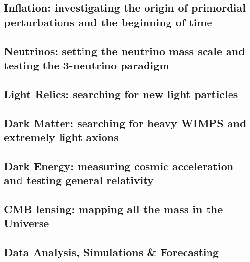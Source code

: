 \subsection*{Inflation: investigating the origin of primordial perturbations and the beginning of time}



\subsection*{Neutrinos: setting the neutrino mass scale and testing the 3-neutrino paradigm}



\subsection*{Light Relics: searching for new light particles}


 
\subsection*{Dark Matter: searching for heavy WIMPS and extremely light axions}



\subsection*{Dark Energy: measuring cosmic acceleration and testing general relativity}



\subsection*{CMB lensing: mapping all the mass in the Universe}



\subsection*{Data Analysis, Simulations \& Forecasting}



\eject






 
